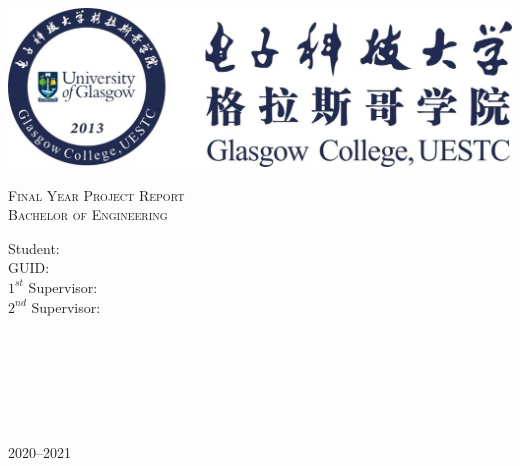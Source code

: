 \begin{titlepage}
    \begin{center}
        \includegraphics{Figures/Badge.jpg}
        \vspace*{.08\textheight}

        \textsc{\Large Final Year Project Report\\Bachelor of Engineering}\\[2cm] %

        {\LARGE \bfseries \thesistitle\par}\vspace{3cm}%

        \begin{minipage}[t]{0.4\textwidth}
            \begin{flushleft} \LARGE
                Student:\\
                \vspace*{.02\textheight}
                GUID:\\
                \vspace*{.02\textheight}
                \(1^{st}\) Supervisor:\\
                \vspace*{.02\textheight}
                \(2^{nd}\) Supervisor:\\
            \end{flushleft}
        \end{minipage}
        \begin{minipage}[t]{0.4\textwidth}
            \begin{flushright} \LARGE
                \student{}\\
                \vspace*{.02\textheight}
                \GUID{}\\
                \vspace*{.02\textheight}
                \firstsupervisor{}\\
                \vspace*{.02\textheight}
                \secondsupervisor{}\\
            \end{flushright}
        \end{minipage}\\[1.5cm]

        \vfill
        {\huge 2020--2021}\\[3cm]
    \end{center}
\end{titlepage}